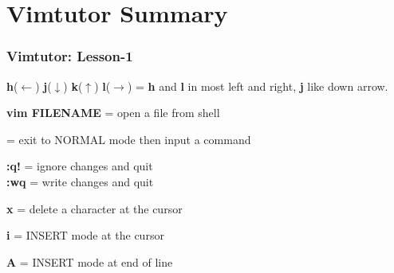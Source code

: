 \documentclass[table,dvipsnames]{beamer}
\begin{document}
    \section{Vimtutor Summary}
    \begin{frame}
        \frametitle{Vimtutor: Lesson-1}
        \begin{exampleblock}{}
            \textbf{h}($\leftarrow$) \textbf{j}($\downarrow$)
            \textbf{k}($\uparrow$) \textbf{l}($\rightarrow$)
            = \textbf{h} and \textbf{l} in most left and right, \textbf{j} like down arrow.
        \end{exampleblock}

        \begin{exampleblock}{}
            \textbf{vim FILENAME} \keys{\return} = open a file from shell
        \end{exampleblock}
    
    	\begin{exampleblock}{}
    		 \keys{\return} = exit to NORMAL mode then input a command
    	\end{exampleblock}

        \begin{exampleblock}{}
            \textbf{:q!} = ignore changes and quit\\
    		\textbf{:wq} = write changes and quit
    	\end{exampleblock}
    
    	\begin{exampleblock}{}
    		\textbf{x} = delete a character at the cursor
    	\end{exampleblock}
    
    	\begin{exampleblock}{}
    		\textbf{i} = INSERT mode at the cursor
    	\end{exampleblock}
    
    	\begin{exampleblock}{}
    		\textbf{A} = INSERT mode at end of line
    	\end{exampleblock}
    \end{frame}
\end{document}
